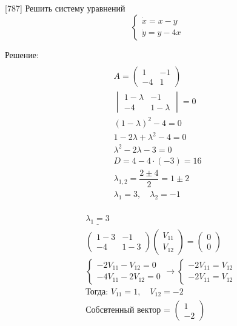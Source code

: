 \documentclass[14pt]{article}
\begin{document}
[787] Решить систему уравнений
\begin{equation*}
    \begin{cases}
        \dot{x} = x - y\\
        \dot{y} = y - 4x
    \end{cases}
\end{equation*}

Решение:
\begin{multline*}
\\ A =
    \begin{pmatrix}
        1 & -1\\
        -4 & 1
    \end{pmatrix}\\
    \begin{vmatrix}
        1 - \lambda & -1\\
        -4 & 1 - \lambda
    \end{vmatrix}
    = 0\\
    (1 - \lambda)^2 - 4 = 0\\
    1 - 2\lambda + \lambda^2 - 4 = 0\\
    \lambda^2 - 2\lambda - 3 = 0\\
    D = 4 - 4 \cdot (-3) = 16\\
    \lambda_{1,2} = \dfrac{2 \pm 4}{2} = 1 \pm 2\\
    \lambda_1 = 3,\quad \lambda_2 = - 1\\
\end{multline*}
\begin{minipage}{.45\textwidth}
    \begin{align*}
        &\underline{\lambda_1 = 3}\\
        &\begin{pmatrix}
            1 - 3 & -1\\
            -4 & 1 - 3
        \end{pmatrix}
        \begin{pmatrix}
            V_{11}\\
            V_{12}
        \end{pmatrix}
        =
        \begin{pmatrix}
            0\\
            0
        \end{pmatrix}\\
        &\begin{cases}
            -2V_{11}-V_{12}=0\\
            -4V_{11}-2V_{12}=0
        \end{cases}
        \rightarrow
        \begin{cases}
            -2V_{11} = V_{12}\\
            -2V_{11} = V_{12}
        \end{cases}\\
        &\text{Тогда: } V_{11} = 1, \quad V_{12} = -2\\
        &\text{Собсвтенный вектор = }
        \begin{pmatrix}
            1\\
            -2
        \end{pmatrix}
    \end{align*}
\end{minipage}
\end{document}

